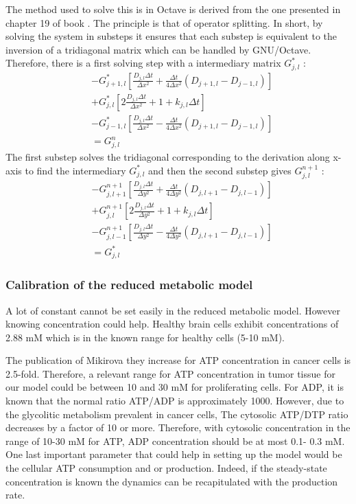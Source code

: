 \documentclass[11pt,a4paper]{article}
\begin{document}
The method used to solve this is in Octave is derived from the one presented in chapter 19 of book \cite{Press1992}. The principle is that of operator splitting. In short, by solving the system in substeps it ensures that each substep is equivalent to the inversion of a tridiagonal matrix which can be handled by GNU/Octave. Therefore, there is a first solving step with a intermediary  matrix $G^{*}_{j,l}$ : 
\begin{align*}
  &-G^{*}_{j+1,l}[ \frac{D_{j,l}\Delta t}{\Delta x^2} + \frac{\Delta t}{4 \Delta x^2}(D_{j+1,l} - D_{j-1,l})]  \\
&+ G^{*}_{j,l}[2 \frac{D_{j,l}\Delta t}{\Delta x^2} +1+k_{j,l}\Delta t]  \\
&- G^{*}_{j-1,l}[ \frac{D_{j,l}\Delta t}{\Delta x^2} - \frac{\Delta t}{4 \Delta x^2}(D_{j+1,l} - D_{j-1,l})]\\
 &= G^{n}_{j,l} 
\end{align*}
The first substep solves the tridiagonal corresponding to the derivation along x-axis to find the intermediary $G^{*}_{j,l}$ and then the second substep gives $G^{n+1}_{j,l}$ :
\begin{align*}
  &-G^{n+1}_{j,l+1}[ \frac{D_{j,l}\Delta t}{\Delta y^2} + \frac{\Delta t}{4 \Delta y^2}(D_{j,l+1} - D_{j,l-1})]  \\
&+ G^{n+1}_{j,l}[2 \frac{D_{j,l}\Delta t}{\Delta y^2} +1 + k_{j,l}\Delta t]  \\
&- G^{n+1}_{j,l-1}[ \frac{D_{j,l}\Delta t}{\Delta y^2} - \frac{\Delta t}{4 \Delta y^2}(D_{j,l+1} - D_{j,l-1})]\\
 &= G^{*}_{j,l} 
\end{align*}


\subsubsection{Calibration of the reduced metabolic model}
A lot of constant cannot be set easily in the reduced metabolic model. However knowing concentration could help. Healthy brain cells exhibit concentrations of 2.88 mM which is in the known range for healthy cells (5-10 mM)\cite{Trautmann2009}\cite{Greiner2021}.

The publication of Mikirova they increase for ATP concentration in cancer cells is 2.5-fold.\cite{Mikirova2018} Therefore, a relevant range for ATP concentration in tumor tissue for our model could be between 10 and 30 mM for proliferating cells. For ADP, it is known that the normal ratio ATP/ADP is approximately 1000.\cite{ZIMMERMAN2011} However, due  to the glycolitic metabolism prevalent in cancer cells, The cytosolic ATP/DTP ratio decreases by a factor of 10 or more.\cite{LEMASTERS2021} Therefore, with cytosolic concentration in the range of 10-30 mM for ATP, ADP concentration should be at most 0.1- 0.3 mM. One last important parameter that could help in setting up the model would be the cellular ATP consumption and or production. Indeed,  if the steady-state concentration is known the dynamics can be recapitulated with the production rate.
\end{document}
